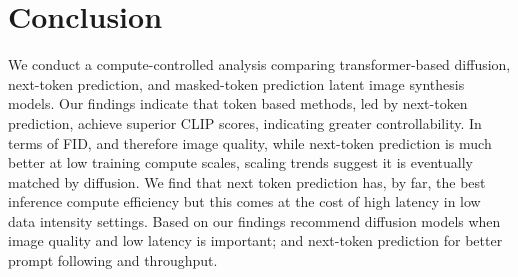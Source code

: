 \scalingsamples\section{Conclusion}
\label{sec:conclusion}

We conduct a compute-controlled analysis comparing transformer-based diffusion, next-token prediction, and masked-token prediction latent image synthesis models. Our findings indicate that token based methods, led by next-token prediction, achieve superior CLIP scores, indicating greater controllability. In terms of FID, and therefore image quality, while next-token prediction is much better at low training compute scales, scaling trends suggest it is eventually matched by diffusion. We find that next token prediction has, by far, the best inference compute efficiency but this comes at the cost of high latency in low data intensity settings. Based on our findings recommend diffusion models when image quality and low latency is important; and next-token prediction for better prompt following and throughput.

\newpage

